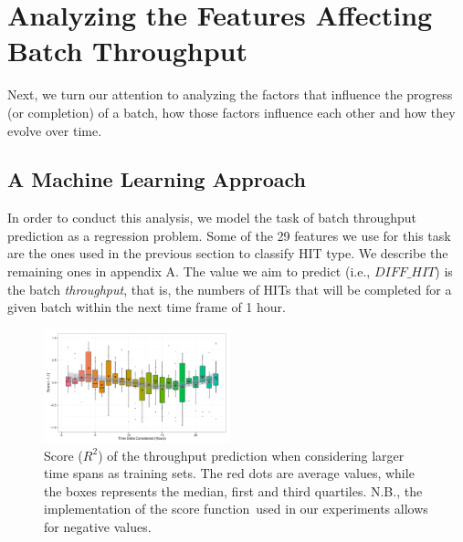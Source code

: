 \section{Analyzing the Features Affecting Batch Throughput}
\label{sec:throughput}
Next, we turn our attention to analyzing the factors that influence the  progress (or completion) of a batch, how those factors influence each other and how they evolve over time.

\subsection{A Machine Learning Approach}
In order to conduct this analysis, we model the task of batch throughput prediction as a regression problem.  Some of the  29  features we use for this task are the ones used in the previous section to classify HIT type.  We describe the remaining ones in appendix A. The value  we aim to predict (i.e.,   $DIFF\_HIT$) is the batch \emph{throughput}, that is, the numbers of HITs that   will be completed for a given batch within the next time frame of 1 hour.

\begin{figure}[tb]
	\centering
		\includegraphics[width=0.48\textwidth]{figures/ML_accuracy}
	\caption{Score ($R^2$) of the throughput prediction when considering larger time spans as training sets. The red dots are average values, while the boxes represents the median, first and third quartiles. N.B., the implementation of the score function\footnotemark~used in our experiments allows for negative values.}
	\label{fig:accuracy}
\end{figure}

